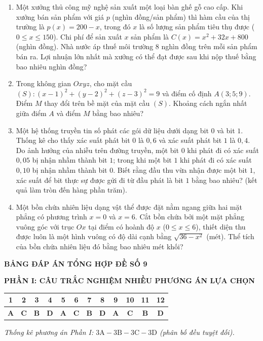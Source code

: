 \documentclass[12pt,a4paper]{article}
\begin{document}
\begin{enumerate}[label=\textbf{Câu \arabic*:}, leftmargin=*]
\item Một xưởng thủ công mỹ nghệ sản xuất một loại bàn ghế gỗ cao cấp. Khi xưởng bán sản phẩm với giá $p$ (nghìn đồng/sản phẩm) thì hàm cầu của thị trường là $p(x) = 200 - x$, trong đó $x$ là số lượng sản phẩm tiêu thụ được ($0 \le x \le 150$). Chi phí để sản xuất $x$ sản phẩm là $C(x) = x^2 + 32x + 800$ (nghìn đồng). Nhà nước áp thuế môi trường $8$ nghìn đồng trên mỗi sản phẩm bán ra. Lợi nhuận lớn nhất mà xưởng có thể đạt được sau khi nộp thuế bằng bao nhiêu nghìn đồng?

\item Trong không gian $Oxyz$, cho mặt cầu $(S): (x - 1)^2 + (y - 2)^2 + (z - 3)^2 = 9$ và điểm cố định $A(3; 5; 9)$. Điểm $M$ thay đổi trên bề mặt của mặt cầu $(S)$. Khoảng cách ngắn nhất giữa điểm $A$ và điểm $M$ bằng bao nhiêu?

\item Một hệ thống truyền tin số phát các gói dữ liệu dưới dạng bit $0$ và bit $1$. Thống kê cho thấy xác suất phát bit $0$ là $0{,}6$ và xác suất phát bit $1$ là $0{,}4$. Do ảnh hưởng của nhiễu trên đường truyền, một bit $0$ khi phát đi có xác suất $0{,}05$ bị nhận nhầm thành bit $1$; trong khi một bit $1$ khi phát đi có xác suất $0{,}10$ bị nhận nhầm thành bit $0$. Biết rằng đầu thu vừa nhận được một bit $1$, xác suất để bit thực sự được gửi đi từ đầu phát là bit $1$ bằng bao nhiêu? (kết quả làm tròn đến hàng phần trăm).

\item Một bồn chứa nhiên liệu dạng vật thể được đặt nằm ngang giữa hai mặt phẳng có phương trình $x = 0$ và $x = 6$. Cắt bồn chứa bởi một mặt phẳng vuông góc với trục $Ox$ tại điểm có hoành độ $x$ ($0 \le x \le 6$), thiết diện thu được luôn là một hình vuông có độ dài cạnh bằng $\sqrt{36 - x^2}$ (mét). Thể tích của bồn chứa nhiên liệu đó bằng bao nhiêu mét khối?

\end{enumerate}

\newpage
\begin{center}
    \textbf{\Large BẢNG ĐÁP ÁN TỔNG HỢP ĐỀ SỐ 9}
\end{center}

\vspace{0.4cm}
\noindent\textbf{\large PHẦN I: CÂU TRẮC NGHIỆM NHIỀU PHƯƠNG ÁN LỰA CHỌN}
\begin{center}
\renewcommand{\arraystretch}{1.3}
\begin{tabular}{|c|c|c|c|c|c|c|c|c|c|c|c|}
\hline
\textbf{1} & \textbf{2} & \textbf{3} & \textbf{4} & \textbf{5} & \textbf{6} & \textbf{7} & \textbf{8} & \textbf{9} & \textbf{10} & \textbf{11} & \textbf{12} \\ \hline
\textbf{A} & \textbf{C} & \textbf{B} & \textbf{D} & \textbf{A} & \textbf{C} & \textbf{B} & \textbf{D} & \textbf{A} & \textbf{C} & \textbf{B} & \textbf{D} \\ \hline
\end{tabular}
\end{center}
\textit{Thống kê phương án Phần I: $3\text{A} - 3\text{B} - 3\text{C} - 3\text{D}$ (phân bố đều tuyệt đối).}
\end{document}

